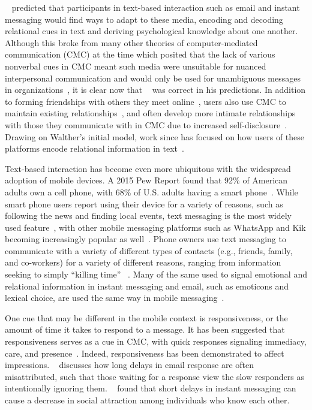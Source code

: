 \documentclass[12pt]{nuthesis}	%
\begin{document}
~\citet{walther1992interpersonal} predicted that participants in text-based interaction such as email and instant messaging would find ways to adapt to these media, encoding and decoding relational cues in text and deriving psychological knowledge about one another. Although this broke from many other theories of computer-mediated communication (CMC) at the time which posited that the lack of various nonverbal cues in CMC meant such media were unsuitable for nuanced interpersonal communication and would only be used for unambiguous messages in organizations~\citep[e.g.][]{daft1986organizational,sproull1986reducing}, it is clear now that ~\citeauthor{walther1992interpersonal} was correct in his predictions. In addition to forming friendships with others they meet online~\citep{grinter2006chatting}, users also use CMC to maintain existing relationships~\citep{hu2004friendships}, and often develop more intimate relationships with those they communicate with in CMC due to increased self-disclosure~\citep{valkenburg2009effects}. Drawing on Walther's initial model, work since has focused on how users of these platforms encode relational information in text~\citep[e.g.][]{hancock2007expressing,pirzadeh2014you}.

Text-based interaction has become even more ubiquitous with the widespread adoption of mobile devices. A 2015 Pew Report found that 92\% of American adults own a cell phone, with 68\% of U.S. adults having a smart phone~\citep{anderson2015technology}. While smart phone users report using their device for a variety of reasons, such as following the news and finding local events, text messaging is the most widely used feature~\citep{smith2015us}, with other mobile messaging platforms such as WhatsApp and Kik becoming increasingly popular as well~\citep{duggan2015mobile}. Phone owners use text messaging to communicate with a variety of different types of contacts (e.g., friends, family, and co-workers) for a variety of different reasons, ranging from information seeking to simply ``killing time'' ~\citep{battestini2010large}. Many of the same used to signal emotional and relational information in instant messaging and email, such as emoticons and lexical choice, are used the same way in mobile messaging~\citep{lo2008nonverbal,tossell2012longitudinal}.

One cue that may be different in the mobile context is responsiveness, or the amount of time it takes to respond to a message. It has been suggested that responsiveness serves as a cue in CMC, with quick responses signaling immediacy, care, and presence~\citep{kalman2006pauses,walther1995nonverbal}. Indeed, responsiveness has been demonstrated to affect impressions. ~\citet{cramton2002attribution} discusses how long delays in email response are often misattributed, such that those waiting for a response view the slow responders as intentionally ignoring them. ~\citet{heston2017worth} found that short delays in instant messaging can cause a decrease in social attraction among individuals who know each other.
\end{document}
